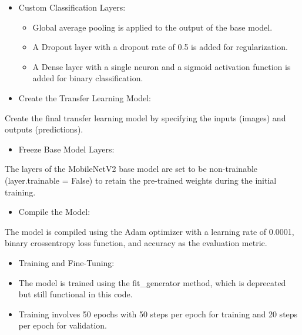 \documentclass{article}
\begin{document}
\begin{itemize}
    \item Custom Classification Layers:
    \begin{itemize}
        \item Global average pooling is applied to the output of the base model.
        \item A Dropout layer with a dropout rate of 0.5 is added for regularization.
        \item A Dense layer with a single neuron and a sigmoid activation function is added for binary classification.
    \end{itemize}
\end{itemize}
   
\begin{itemize}
    \item Create the Transfer Learning Model:
\end{itemize}
Create the final transfer learning model by specifying the inputs (images) and outputs (predictions).
 
\begin{itemize}
    \item Freeze Base Model Layers:
\end{itemize}
The layers of the MobileNetV2 base model are set to be non-trainable (layer.trainable = False) to retain the pre-trained weights during the initial training.

\begin{itemize}
    \item Compile the Model:
\end{itemize}
The model is compiled using the Adam optimizer with a learning rate of 0.0001, binary crossentropy loss function, and accuracy as the evaluation metric.  

\begin{itemize}
    \item Training and Fine-Tuning:
\end{itemize}
\begin{itemize}
    \begin{itemize}
        \item The model is trained using the fit\_generator method, which is deprecated but still functional in this code.

        \item Training involves 50 epochs with 50 steps per epoch for training and 20 steps per epoch for validation.
    \end{itemize}
\end{itemize}
\end{document}
